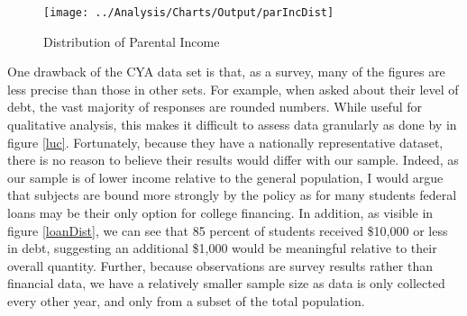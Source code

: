 \documentclass[12pt]{article}
\begin{document}
	\begin{figure}
		\centering
		\caption{Distribution of Parental Income}
		\label{incDist}
		\texttt{[image: ../Analysis/Charts/Output/parIncDist]}
	\end{figure}
	
	One drawback of the CYA data set is that, as a survey, many of the figures are less precise than those in other sets. For example, when asked about their level of debt, the vast majority of responses are rounded numbers. While useful for qualitative analysis, this makes it difficult to assess data granularly as done by \textcite{lucca2018} in figure \ref{luc}. Fortunately, because they have a nationally representative dataset, there is no reason to believe their results would differ with our sample. Indeed, as our sample is of lower income relative to the general population, I would argue that subjects are bound more strongly by the policy as for many students federal loans may be their only option for college financing. In addition, as visible in figure \ref{loanDist}, we can see that 85 percent of students received \$10,000 or less in debt, suggesting an additional \$1,000 would be meaningful relative to their overall quantity. Further, because observations are survey results rather than financial data, we have a relatively smaller sample size as data is only collected every other year, and only from a subset of the total population.
	
\end{document}
